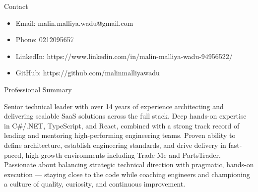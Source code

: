 \documentclass{mcdowellcv}
\begin{document}
\makeheader

\begin{cvsection}{Contact}
    \begin{cvsubsection}{}{}{}
        \begin{itemize}
            \item Email: malin.malliya.wadu@gmail.com
            \item Phone: 0212095657
            \item LinkedIn: https://www.linkedin.com/in/malin-malliya-wadu-94956522/
            \item GitHub: https://github.com/malinmalliyawadu
        \end{itemize}
    \end{cvsubsection}
\end{cvsection}

\begin{cvsection}{Professional Summary}
    \begin{cvsubsection}{}{}{}
        Senior technical leader with over 14 years of experience architecting and delivering scalable SaaS solutions across the full stack. Deep hands-on expertise in C\#/.NET, TypeScript, and React, combined with a strong track record of leading and mentoring high-performing engineering teams. Proven ability to define architecture, establish engineering standards, and drive delivery in fast-paced, high-growth environments including Trade Me and PartsTrader. Passionate about balancing strategic technical direction with pragmatic, hands-on execution --- staying close to the code while coaching engineers and championing a culture of quality, curiosity, and continuous improvement.
    \end{cvsubsection}
\end{cvsection}
\end{document}

